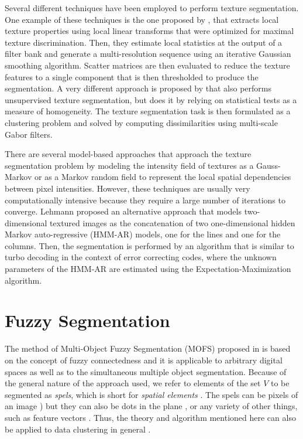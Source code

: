 \documentclass[10pt,twocolumn,letterpaper]{article}
\begin{document}
Several different techniques have been employed to perform texture segmentation. One example of these techniques is the one proposed by \cite{UNSE89a}, that extracts local texture properties using local linear transforms that were optimized for maximal texture discrimination. Then, they estimate local statistics at the output of a filter bank and generate a multi-resolution sequence using an iterative Gaussian smoothing algorithm. Scatter matrices are then evaluated to reduce the texture features to a single component that is then thresholded to produce the segmentation. A very different approach is proposed by \cite{HOFM98a} that also performs unsupervised texture segmentation, but does it by relying on statistical tests as a measure of homogeneity. The texture segmentation task is then formulated as a clustering problem and solved by computing dissimilarities using multi-scale Gabor filters.

There are several model-based approaches \cite{CHEL85a,MANJ91a,ROBE95a} that approach the texture segmentation problem by modeling the intensity field of textures as a Gauss-Markov or as a Markov random field to represent the local spatial dependencies between pixel intensities. However, these techniques are usually very computationally intensive because they require a large number of iterations to converge. Lehmann \cite{LEHM11a} proposed an alternative approach that models two-dimensional textured images as the concatenation of two one-dimensional hidden Markov auto-regressive (HMM-AR) models, one for the lines and one for the columns. Then, the segmentation is performed by an algorithm that is similar to turbo decoding in the context of error correcting codes, where the unknown parameters of the HMM-AR are estimated using the Expectation-Maximization algorithm.

\section{Fuzzy Segmentation}\label{sec:FuzzySeg}
%
The method of Multi-Object Fuzzy Segmentation (MOFS) proposed in \cite{HERM01b} is based on the concept of fuzzy connectedness and it is applicable to arbitrary digital spaces \cite{HERM98c} as well as to the simultaneous multiple object segmentation. Because of the general nature of the approach used, we refer to elements of the set $V$ to be segmented as \emph{spels}, which is short for \emph{spatial elements} \cite{HERM98c}. The spels can be pixels of an image  \cite{CARV05a}) but they can also be dots in the plane \cite{AHUJ82a}, or any variety of other things, such as feature vectors \cite{DUDA00a}. Thus, the theory and algorithm mentioned here can also be applied to data clustering in general \cite{JAIN99a}.
\end{document}
